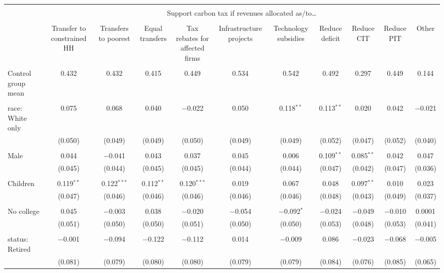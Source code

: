 
\begin{tabular}{@{\extracolsep{5pt}}lcccccccccc} 
\\[-1.8ex]\hline 
\hline \\[-1.8ex] 
 & \multicolumn{10}{c}{Support carbon tax if revenues allocated as/to…} \\ 
\cline{2-11} 
\\[-1.8ex] & Transfer to constrained HH & Transfers to poorest & Equal transfers & Tax rebates for affected firms & Infrastructure projects & Technology subsidies & Reduce deficit & Reduce CIT & Reduce PIT & Other \\ 
\hline \\[-1.8ex] 
 Control group mean & 0.432 & 0.432 & 0.415 & 0.449 & 0.534 & 0.542 & 0.492 & 0.297 & 0.449 & 0.144  \\ \hline \\[-1.8ex] race: White only & 0.075 & 0.068 & 0.040 & $-$0.022 & 0.050 & 0.118$^{**}$ & 0.113$^{**}$ & 0.020 & 0.042 & $-$0.021 \\ 
  & (0.050) & (0.049) & (0.049) & (0.050) & (0.049) & (0.049) & (0.052) & (0.047) & (0.052) & (0.040) \\ 
  & & & & & & & & & & \\ 
 Male & 0.044 & $-$0.041 & 0.043 & 0.037 & 0.045 & 0.006 & 0.109$^{**}$ & 0.085$^{**}$ & 0.042 & 0.047 \\ 
  & (0.045) & (0.044) & (0.045) & (0.045) & (0.044) & (0.044) & (0.047) & (0.042) & (0.047) & (0.036) \\ 
  & & & & & & & & & & \\ 
 Children & 0.119$^{**}$ & 0.122$^{***}$ & 0.112$^{**}$ & 0.120$^{***}$ & 0.019 & 0.067 & 0.048 & 0.097$^{**}$ & 0.010 & 0.023 \\ 
  & (0.047) & (0.046) & (0.046) & (0.046) & (0.046) & (0.046) & (0.048) & (0.043) & (0.049) & (0.037) \\ 
  & & & & & & & & & & \\ 
 No college & 0.045 & $-$0.003 & 0.038 & $-$0.020 & $-$0.054 & $-$0.092$^{*}$ & $-$0.024 & $-$0.049 & $-$0.010 & 0.0001 \\ 
  & (0.051) & (0.050) & (0.050) & (0.051) & (0.050) & (0.050) & (0.053) & (0.048) & (0.053) & (0.041) \\ 
  & & & & & & & & & & \\ 
 status: Retired & $-$0.001 & $-$0.094 & $-$0.122 & $-$0.112 & 0.014 & $-$0.009 & 0.086 & $-$0.023 & $-$0.068 & $-$0.005 \\ 
  & (0.081) & (0.079) & (0.080) & (0.080) & (0.079) & (0.079) & (0.084) & (0.076) & (0.085) & (0.065) \\ 

\end{tabular}
